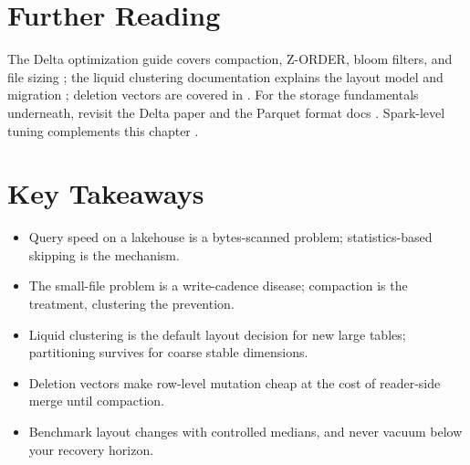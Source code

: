\section{Further Reading}
The Delta optimization guide covers compaction, Z-ORDER, bloom filters, and file sizing \cite{databricksDeltaOptimize}; the liquid clustering documentation explains the layout model and migration \cite{databricksLiquidClustering}; deletion vectors are covered in \cite{databricksDeletionVectors}. For the storage fundamentals underneath, revisit the Delta paper \cite{armbrust2020delta} and the Parquet format docs \cite{apacheParquet}. Spark-level tuning complements this chapter \cite{sparkSQLTuning}.

\section*{Key Takeaways}
\begin{itemize}
    \item Query speed on a lakehouse is a bytes-scanned problem; statistics-based skipping is the mechanism.
    \item The small-file problem is a write-cadence disease; compaction is the treatment, clustering the prevention.
    \item Liquid clustering is the default layout decision for new large tables; partitioning survives for coarse stable dimensions.
    \item Deletion vectors make row-level mutation cheap at the cost of reader-side merge until compaction.
    \item Benchmark layout changes with controlled medians, and never vacuum below your recovery horizon.
\end{itemize}

